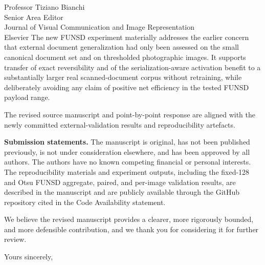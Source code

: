 \documentclass[11pt,a4paper]{letter}
\begin{document}
\begin{letter}{Professor Tiziano Bianchi\\Senior Area Editor\\Journal of Visual Communication and Image Representation\\Elsevier}
The new FUNSD experiment materially addresses the earlier concern that external document generalization had only been assessed on the small canonical document set and on thresholded photographic images. It supports transfer of exact reversibility and of the serialization-aware activation benefit to a substantially larger real scanned-document corpus without retraining, while deliberately avoiding any claim of positive net efficiency in the tested FUNSD payload range.

The revised source manuscript and point-by-point response are aligned with the newly committed external-validation results and reproducibility artefacts.

\textbf{Submission statements.} The manuscript is original, has not been published previously, is not under consideration elsewhere, and has been approved by all authors. The authors have no known competing financial or personal interests. The reproducibility materials and experiment outputs, including the fixed-128 and Otsu FUNSD aggregate, paired, and per-image validation results, are described in the manuscript and are publicly available through the GitHub repository cited in the Code Availability statement.

We believe the revised manuscript provides a clearer, more rigorously bounded, and more defensible contribution, and we thank you for considering it for further review.

\closing{Yours sincerely,}

\end{letter}
\end{document}
